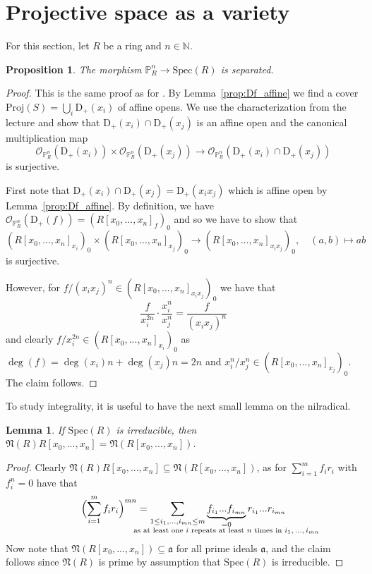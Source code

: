 \documentclass{scrartcl}
\newcommand{\N}{\mathbb{N}}
\newcommand{\D}[1]{\mathrm{D}_+(#1)}
\renewcommand{\P}{\mathbb{P}}
\renewcommand{\a}{\mathfrak{a}}
\newcommand{\Nil}{\mathfrak{N}}
\newcommand{\Spec}{\mathrm{Spec}}
\newcommand{\Proj}{\mathrm{Proj}}
\renewcommand{\O}{\mathcal{O}}
\newcommand{\citestacks}[1]{\cite[\href{https://stacks.math.columbia.edu/tag/#1}{Tag #1}]{stacks}}
\newtheorem{prop}[subsection]{Proposition}
\newtheorem{lemma}[subsection]{Lemma}
\theoremstyle{definition}
\begin{document}
\section{Projective space as a variety}
For this section, let $R$ be a ring and $n \in \N$.
\begin{prop}
    \label{prop:projective_space_separated}
    The morphism $\P_R^n \to \Spec(R)$ is separated.
\end{prop}
\begin{proof}
    This is the same proof as for \citestacks{01MC}.
    By Lemma~\ref{prop:Df_affine} we find a cover $\Proj(S) = \bigcup_i \D{x_i}$ of affine opens.
    We use the characterization from the lecture and show that $\D{x_i} \cap \D{x_j}$ is an affine open and the canonical multiplication map
    \begin{equation*}
        \O_{\P_R^n}(\D{x_i}) \times \O_{\P_R^n}(\D{x_j}) \to \O_{\P_R^n}(\D{x_i} \cap \D{x_j})
    \end{equation*}
    is surjective.
    
    First note that $\D{x_i} \cap \D{x_j} = \D{x_ix_j}$ which is affine open by Lemma~\ref{prop:Df_affine}.
    By definition, we have $\O_{\P_R^n}(\D{f}) = (R[x_0, ..., x_n]_f)_0$ and so we have to show that
    \begin{equation*}
        (R[x_0, ..., x_n]_{x_i})_0 \times (R[x_0, ..., x_n]_{x_j})_0 \to (R[x_0, ..., x_n]_{x_ix_j})_0, \quad (a, b) \mapsto ab
    \end{equation*}
    is surjective.
    
    However, for $f/(x_ix_j)^n \in (R[x_0, ..., x_n]_{x_ix_j})_0$ we have that
    \begin{equation*}
        \frac f {x_i^{2n}} \cdot \frac {x_i^n} {x_j^n} = \frac f {(x_ix_j)^n}
    \end{equation*}
    and clearly $f/x_i^{2n} \in (R[x_0, ..., x_n]_{x_i})_0$ as $\deg(f) = \deg(x_i) n + \deg(x_j) n = 2n$ and $x_i^n/x_j^n \in (R[x_0, ..., x_n]_{x_j})_0$.
    The claim follows.
\end{proof}
To study integrality, it is useful to have the next small lemma on the nilradical.
\begin{lemma}
    \label{prop:nil_poly_ring}
    If $\Spec(R)$ is irreducible, then $\Nil(R)R[x_0, ..., x_n] = \Nil(R[x_0, ..., x_n])$.
\end{lemma}
\begin{proof}
    Clearly $\Nil(R)R[x_0, ..., x_n] \subseteq \Nil(R[x_0, ..., x_n])$, as for $\sum_{i = 1}^m f_i r_i$ with $f_i^n = 0$ have that
    \begin{equation*}
        \Bigl( \sum_{i = 1}^m f_i r_i \Bigr)^{m n} = \sum_{1 \leq i_1, ..., i_{mn} \leq m} \underbrace{f_{i_1} ... f_{i_{mn}}}_{\mathclap{\substack{= 0 \\ \text{as at least one $i$ repeats at least $n$ times in $i_1, ..., i_{mn}$}}}} r_{i_1} ... r_{i_{m n}}
    \end{equation*}
    Now note that $\Nil(R[x_0, ..., x_n]) \subseteq \a$ for all prime ideals $\a$, and the claim follows since $\Nil(R)$ is prime by assumption that $\Spec(R)$ is irreducible.
\end{proof}
\end{document}
